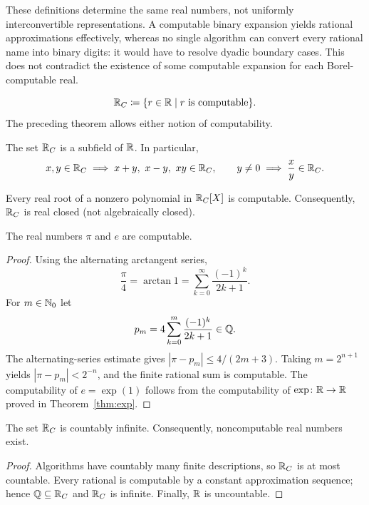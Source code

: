 \begin{remark}
These definitions determine the same real numbers, not uniformly
interconvertible representations. A computable binary expansion yields
rational approximations effectively, whereas no single algorithm can
convert every rational name into binary digits: it would have to
resolve dyadic boundary cases. This does not contradict the existence
of some computable expansion for each Borel-computable real.
\end{remark}

\begin{definition}
\[
 \mathbb{R}_C\coloneqq\{r\in\mathbb{R}\mid r\text{ is computable}\}.
\]
The preceding theorem allows either notion of computability.
\end{definition}

\begin{proposition}
The set $\mathbb{R}_C$ is a subfield of $\mathbb{R}$. In particular,
\[
 x, y\in\mathbb{R}_C\implies x+y, \ x-y, \ xy\in\mathbb{R}_C,
 \qquad y\ne0\implies\frac{x}{y}\in\mathbb{R}_C.
\]
\end{proposition}

\begin{proposition}
Every real root of a nonzero polynomial in $\mathbb{R}_C[X]$ is computable.
Consequently, $\mathbb{R}_C$ is real closed (not algebraically closed).
\end{proposition}

\begin{proposition}
The real numbers $\pi$ and $e$ are computable.
\end{proposition}
\begin{proof}
Using the alternating arctangent series,
\[
 \frac{\pi}{4}=\arctan 1=\sum_{k=0}^{\infty}\frac{(-1)^k}{2k+1}.
\]
For $m\in\mathbb{N}_0$ let
\[
 p_m=4\sum_{k=0}^{m}\frac{(-1)^k}{2k+1}\in\mathbb{Q}.
\]
The alternating-series estimate gives
$|\pi-p_m|\le4/(2m+3)$. Taking $m=2^{n+1}$ yields
$|\pi-p_m|<2^{-n}$, and the finite rational sum is computable.
The computability of $e=\exp(1)$ follows from the computability of
$\exp\colon\mathbb{R}\to\mathbb{R}$ proved in Theorem~\ref{thm:exp}.
\end{proof}

\begin{proposition}
The set $\mathbb{R}_C$ is countably infinite. Consequently, noncomputable
real numbers exist.
\end{proposition}
\begin{proof}
Algorithms have countably many finite descriptions, so $\mathbb{R}_C$ is at
most countable. Every rational is computable by a constant
approximation sequence; hence $\mathbb{Q}\subseteq\mathbb{R}_C$ and $\mathbb{R}_C$ is infinite.
Finally, $\mathbb{R}$ is uncountable.
\end{proof}

